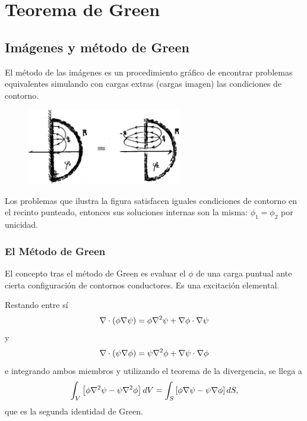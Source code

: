 \documentclass[10pt,oneside]{CBFT_book}
\begin{document}
\chapter{Teorema de Green}

\section{Imágenes y método de Green}

El método de las imágenes es un procedimiento gráfico de encontrar problemas equivalentes simulando
con cargas extras (cargas imagen) las condiciones de contorno.

\begin{figure}[htb]
	\begin{center}
	\includegraphics[width=0.6\textwidth]{images/fig_ft1_imagegreen1.pdf}	 
	\end{center}
	\caption{}
\end{figure} 

Los problemas que ilustra la figura satisfacen iguales condiciones de contorno en el recinto punteado,
entonces sus soluciones internas son la misma: $\phi_1 = \phi_2$ por unicidad.

\subsection{El Método de Green}

El concepto tras el método de Green es evaluar el $\phi$ de una carga puntual ante cierta configuración
de contornos conductores. Es una excitación elemental.

Restando entre sí
\[
	\mathbf{\nabla}\cdot(\phi\mathbf{\nabla}\psi) = \phi\nabla^2{\psi} + \mathbf{\nabla}\phi\cdot\mathbf{\nabla}\psi
\]
y
\[
	\mathbf{\nabla}\cdot(\psi\mathbf{\nabla}\phi) = \psi\nabla^2{\phi} + \mathbf{\nabla}\psi\cdot\mathbf{\nabla}\phi
\]
e integrando ambos miembros y utilizando el teorema de la divergencia, se llega a
\[
	\int_V \left[ \phi\nabla^2{\psi} - \psi\nabla^2{\phi}\right] dV =
	\int_S \left[ \phi\mathbf{\nabla}\psi - \psi\mathbf{\nabla}\phi \right] dS,
\]
que es la segunda identidad de Green.
\end{document}
